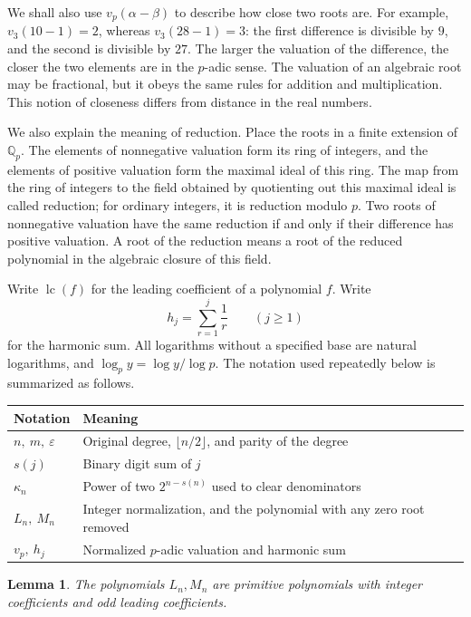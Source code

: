 \documentclass[11pt,a4paper]{article}
\numberwithin{equation}{section}
\newtheorem{lemma}[theorem]{Lemma}
\theoremstyle{definition}
\begin{document}
We shall also use \(v_p(\alpha-\beta)\) to describe how close two roots are. For example, \(v_3(10-1)=2\), whereas \(v_3(28-1)=3\): the first difference is divisible by \(9\), and the second is divisible by \(27\). The larger the valuation of the difference, the closer the two elements are in the \(p\)-adic sense. The valuation of an algebraic root may be fractional, but it obeys the same rules for addition and multiplication. This notion of closeness differs from distance in the real numbers.

We also explain the meaning of reduction. Place the roots in a finite extension of \(\mathbb Q_p\). The elements of nonnegative valuation form its ring of integers, and the elements of positive valuation form the maximal ideal of this ring. The map from the ring of integers to the field obtained by quotienting out this maximal ideal is called reduction; for ordinary integers, it is reduction modulo \(p\). Two roots of nonnegative valuation have the same reduction if and only if their difference has positive valuation. A root of the reduction means a root of the reduced polynomial in the algebraic closure of this field.

Write \(\operatorname{lc}(f)\) for the leading coefficient of a polynomial \(f\). Write
\[
h_j=\sum_{r=1}^{j}\frac1r\qquad(j\ge1)
\]
for the harmonic sum. All logarithms without a specified base are natural logarithms, and \(\log_p y=\log y/\log p\). The notation used repeatedly below is summarized as follows.

\begin{center}
\begin{tabular}{@{}p{}p{}@{}}
\toprule
Notation & Meaning\\
\midrule
\(n,\ m,\ \varepsilon\) & Original degree, \(\lfloor n/2\rfloor\), and parity of the degree\\
\(s(j)\) & Binary digit sum of \(j\)\\
\(\kappa_n\) & Power of two \(2^{n-s(n)}\) used to clear denominators\\
\(L_n,\ M_n\) & Integer normalization, and the polynomial with any zero root removed\\
\(v_p,\ h_j\) & Normalized \(p\)-adic valuation and harmonic sum\\
\bottomrule
\end{tabular}
\end{center}

\begin{lemma}\label{lem:primitive}
The polynomials \(L_n,M_n\) are primitive polynomials with integer coefficients and odd leading coefficients.
\end{lemma}
\end{document}
